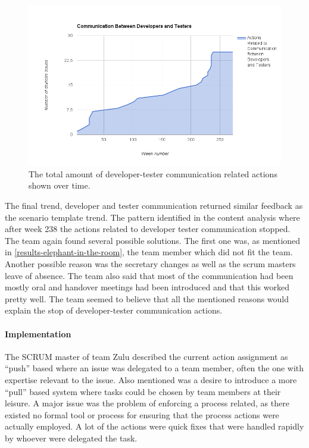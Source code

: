 \begin{figure}[!h]
	\centering
	\includegraphics[width=\textwidth, keepaspectratio]{figures/devtestcom.png}
	\caption{The total amount of developer-tester communication related actions shown over time.}
	\label{figure:dev-test-com}
\end{figure}

The final trend, developer and tester communication returned similar feedback as the scenario template trend. The pattern identified in the content analysis where after week 238 the actions related to developer tester communication stopped. The team again found several possible solutions. The first one was, as mentioned in \autoref{results-elephant-in-the-room}, the team member which did not fit the team. Another possible reason was the secretary changes as well as the scrum masters leave of absence. The team also said that most of the communication had been mostly oral and handover meetings had been introduced and that this worked pretty well. The team seemed to believe that all the mentioned reasons would explain the stop of developer-tester communication actions. 

\paragraph{Implementation}

The SCRUM master of team Zulu described the current action assignment as ``push'' based where an issue was delegated to a team member, often the one with expertise relevant to the issue. Also mentioned was a desire to introduce a more ``pull'' based system where tasks could be chosen by team members at their leisure. A major issue was the problem of enforcing a process related, as there existed no formal tool or process for ensuring that the process actions were actually employed. A lot of the actions were quick fixes that were handled rapidly by whoever were delegated the task.

